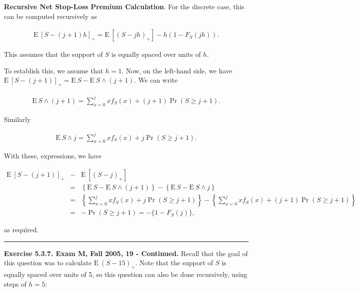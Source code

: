 \documentclass[]{book}
\theoremstyle{definition}
\theoremstyle{definition}
\theoremstyle{definition}
\theoremstyle{remark}
\begin{document}
\textbf{Recursive Net Stop-Loss Premium Calculation}. For the discrete
case, this can be computed recursively as

\begin{eqnarray*}
\mathrm{E~}\left[ S-(j+1)h \right] _{+}=\mathrm{E~}\left[ ( S-jh )_{+} \right] -h \left( 1-F_S(jh)
\right) .
\end{eqnarray*}

This assumes that the support of \(S\) is equally spaced over units of
\(h\).

To establish this, we assume that \(h=1\). Now, on the left-hand side,
we have
\(\mathrm{E~}\left[ S-(j+1) \right] _{+}=\mathrm{E~}S - \mathrm{E~}S\wedge (j+1)\).
We can write

\begin{eqnarray*}
\mathrm{E~}S\wedge (j+1) = \sum_{x=0}^{j}xf_S(x) + (j+1)\Pr(S \ge j+1).
\end{eqnarray*}

Similarly

\begin{eqnarray*}
\mathrm{E~}S\wedge j = \sum_{x=0}^{j}xf_S(x) + j\Pr(S\ge j+1).
\end{eqnarray*}

With these, expressions, we have

\begin{eqnarray*}
\mathrm{E~}\left[ S-(j+1) \right] _{+} &-& \mathrm{E~}\left[ ( S-j )_{+} \right]  \\
&=&\left\{\mathrm{E~}S - \mathrm{E~}S\wedge (j+1) \right\}
-\left\{\mathrm{E~}S - \mathrm{E~}S\wedge j \right\} \\
&=&\left\{ \sum_{x=0}^{j}xf_S(x) + j\Pr(S\ge j+1) \right\}
- \left\{ \sum_{x=0}^{j}xf_S(x) + (j+1)\Pr(S \ge j+1) \right\} \\
&=& -\Pr(S\ge j+1) = -\{1 - F_{S}(j)\},
\end{eqnarray*}

as required.

\begin{center}\rule{0.5\linewidth}{\linethickness}\end{center}

\textbf{Exercise 5.3.7. Exam M, Fall 2005, 19 - Continued.} Recall that
the goal of this question was to calculate \(\mathrm{E~}(S-15)_+\). Note
that the support of \(S\) is equally spaced over units of 5, so this
question can also be done recursively, using steps of \(h=5\):
\end{document}
